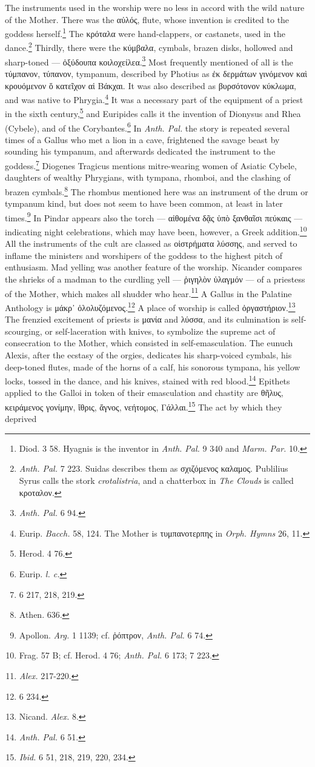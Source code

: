 \documentclass[a4paper, 11pt, oneside, polutonikogreek, english]{article}
\begin{document}
The instruments used in the worship were no less in accord with the wild nature of the Mother. There was the αὐλός, flute, whose invention is credited to the goddess herself.\footnote{Diod. 3 58. Hyagnis is the inventor in \emph{Anth. Pal.} 9 340 and \emph{Marm. Par.} 10.} The κρόταλα were hand-clappers, or castanets, used in the dance.\footnote{\emph{Anth. Pal.} 7 223. Suidas describes them as σχιζόμενος καλαμος. Publilius Syrus calls the stork \emph{crotalistria}, and a chatterbox in \emph{The Clouds} is called κροταλον.} Thirdly, there were the κύμβαλα, cymbals, brazen disks, hollowed and sharp-toned --- ὀξύδουπα κοιλοχείλεα.\footnote{\emph{Anth. Pal.} 6 94.} Most frequently mentioned of all is the τύμπανον, τύπανον, tympanum, described by Photius as ἐκ δερμάτων γινόμενον καὶ κρουόμενον ὅ κατεῖχον αἱ Βάκχαι. It was also described as βυρσότονον κύκλωμα, and was native to Phrygia.\footnote{Eurip. \emph{Bacch.} 58, 124. The Mother is τυμπανοτερπης in \emph{Orph. Hymns} 26, 11.} It was a necessary part of the equipment of a priest in the sixth century,\footnote{Herod. 4 76.} and Euripides calls it the invention of Dionysus and Rhea (Cybele), and of the Corybantes.\footnote{Eurip. \emph{l. c.}} In \emph{Anth. Pal.} the story is repeated several times of a Gallus who met a lion in a cave, frightened the savage beast by sounding his tympanum, and afterwards dedicated the instrument to the goddess.\footnote{6 217, 218, 219.} Diogenes Tragicus mentions mitre-wearing women of Asiatic Cybele, daughters of wealthy Phrygians, with tympana, rhomboi, and the clashing of brazen cymbals.\footnote{Athen. 636.} The rhombus mentioned here was an instrument of the drum or tympanum kind, but does not seem to have been common, at least in later times.\footnote{Apollon. \emph{Arg.} 1 1139; cf. ῥόπτρον, \emph{Anth. Pal.} 6 74.} In Pindar appears also the torch --- αἰθομένα δᾷς ὑπὸ ξανθαῖσι πεύκαις --- indicating night celebrations, which may have been, however, a Greek addition.\footnote{Frag. 57 B; cf. Herod. 4 76; \emph{Anth. Pal.} 6 173; 7 223.} All the instruments of the cult are classed as οἰστρήματα λύσσης, and served to inflame the ministers and worshipers of the goddess to the highest pitch of enthusiasm. Mad yelling was another feature of the worship. Nicander compares the shrieks of a madman to the curdling yell --- ῥιγηλὸν ὑλαγμόν --- of a priestess of the Mother, which makes all shudder who hear.\footnote{\emph{Alex.} 217-220.} A Gallus in the Palatine Anthology is μάκρ᾽ ὀλολυζόμενος.\footnote{6 234.} A place of worship is called ὀργαστήριον.\footnote{Nicand. \emph{Alex.} 8.} The frenzied excitement of priests is μανία and λύσσα, and its culmination is self-scourging, or self-laceration with knives, to symbolize the supreme act of consecration to the Mother, which consisted in self-emasculation. The eunuch Alexis, after the ecstasy of the orgies, dedicates his sharp-voiced cymbals, his deep-toned flutes, made of the horns of a calf, his sonorous tympana, his yellow locks, tossed in the dance, and his knives, stained with red blood.\footnote{\emph{Anth. Pal.} 6 51.} Epithets applied to the Galloi in token of their emasculation and chastity are θῆλυς, κειράμενος γονίμην, ἴθρις, ἄγνος, νεήτομος, Γάλλαι.\footnote{\emph{Ibid.} 6 51, 218, 219, 220, 234.} The act by which they deprived 
\end{document}

